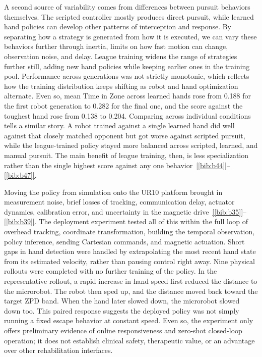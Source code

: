 \documentclass[journal,twoside,web]{ieeecolor2}
\newcommand{\citelink}[1]{\hyperref[bib:#1]{[\ref*{bib:#1}]}}
\newcommand{\citerange}[2]{\citelink{#1}--\citelink{#2}}
\begin{document}
A second source of variability comes from differences between pursuit behaviors themselves. The scripted controller mostly produces direct pursuit, while learned hand policies can develop other patterns of interception and response. By separating how a strategy is generated from how it is executed, we can vary these behaviors further through inertia, limits on how fast motion can change, observation noise, and delay. League training widens the range of strategies further still, adding new hand policies while keeping earlier ones in the training pool. Performance across generations was not strictly monotonic, which reflects how the training distribution keeps shifting as robot and hand optimization alternate. Even so, mean Time in Zone across learned hands rose from 0.188 for the first robot generation to 0.282 for the final one, and the score against the toughest hand rose from 0.138 to 0.204. Comparing across individual conditions tells a similar story. A robot trained against a single learned hand did well against that closely matched opponent but got worse against scripted pursuit, while the league-trained policy stayed more balanced across scripted, learned, and manual pursuit. The main benefit of league training, then, is less specialization rather than the single highest score against any one behavior~\citerange{b44}{b47}.

Moving the policy from simulation onto the UR10 platform brought in measurement noise, brief losses of tracking, communication delay, actuator dynamics, calibration error, and uncertainty in the magnetic drive~\citerange{b35}{b39}. The deployment experiment tested all of this within the full loop of overhead tracking, coordinate transformation, building the temporal observation, policy inference, sending Cartesian commands, and magnetic actuation. Short gaps in hand detection were handled by extrapolating the most recent hand state from its estimated velocity, rather than pausing control right away. Nine physical rollouts were completed with no further training of the policy. In the representative rollout, a rapid increase in hand speed first reduced the distance to the microrobot. The robot then sped up, and the distance moved back toward the target ZPD band. When the hand later slowed down, the microrobot slowed down too. This paired response suggests the deployed policy was not simply running a fixed escape behavior at constant speed. Even so, the experiment only offers preliminary evidence of online responsiveness and zero-shot closed-loop operation; it does not establish clinical safety, therapeutic value, or an advantage over other rehabilitation interfaces.
\end{document}
